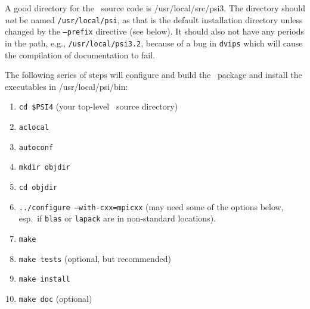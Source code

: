 \documentclass[12pt]{article}
\begin{document}
A good directory for the \PSIfour\ source code is /usr/local/src/psi3.
The directory should {\em not} be named {\tt /usr/local/psi}, as that is
the default installation directory unless changed by the {\tt --prefix}
directive (see below).  It should also not have any periods in the path,
e.g., {\tt /usr/local/psi3.2}, because of a bug in {\tt dvips} which will
cause the compilation of documentation to fail.

The following series of steps will configure and build the \PSIfour\
package and install the executables in /usr/local/psi/bin:

\begin{enumerate}
\item {\tt cd \$PSI4} (your top-level \PSIfour\ source directory)
\item {\tt aclocal}
\item {\tt autoconf}
\item {\tt mkdir objdir}
\item {\tt cd objdir}
\item {\tt ../configure --with-cxx=mpicxx} 
  (may need some of the options below, esp.~if
  {\tt blas} or {\tt lapack} are in non-standard locations). 
\item {\tt make}
\item {\tt make tests} (optional, but recommended)
\item {\tt make install}
\item {\tt make doc} (optional)
\end{enumerate}
\end{document}
